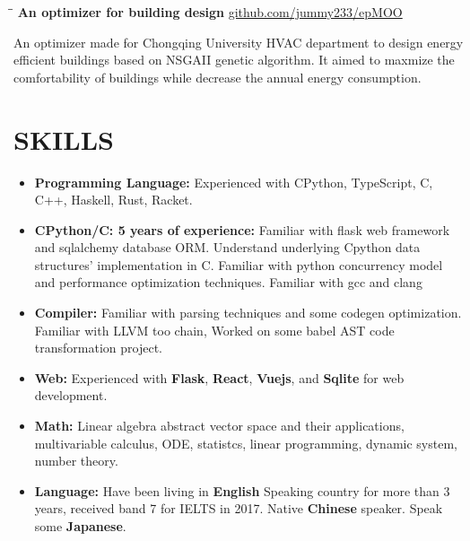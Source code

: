 \documentclass{res}
\begin{document}
\begin{resume}
    \vspace{-0.2in}
    \begin{tabbing}
        \hspace{2.4in}\= \hspace{0.9in}\= \kill
        {\bf An optimizer for building design} \>               \>\url{github.com/jummy233/epMOO}\\
    \end{tabbing}\vspace{-30pt}
    An optimizer made for Chongqing University HVAC department
    to design energy efficient buildings based on NSGAII genetic algorithm.
    It aimed to maxmize the comfortability of buildings while decrease the
    annual energy consumption.

\section{SKILLS}
    \begin{itemize}[leftmargin=-.2in]
        \setlength\itemsep{-1em}

        \item \textbf{Programming Language:} Experienced with CPython, TypeScript, C, C++, Haskell, Rust, Racket.\\
        \item \textbf{CPython/C: 5 years of experience:} Familiar with flask web framework and sqlalchemy database ORM. Understand underlying Cpython data structures' implementation in C. Familiar with python concurrency model and performance optimization techniques. Familiar with gcc and clang\\
        \item \textbf{Compiler:} Familiar with parsing techniques and some codegen optimization. Familiar with LLVM too chain, Worked on some babel AST code transformation project. \\
        \item \textbf{Web:} Experienced with \textbf{Flask}, \textbf{React}, \textbf{Vuejs}, and \textbf{Sqlite} for web development. \\
        \item \textbf{Math:} Linear algebra abstract vector space and their applications, multivariable calculus, ODE, statistcs, linear programming, dynamic system, number theory. \\
        \item \textbf{Language:}
    Have been living in \textbf{English} Speaking country for more than 3 years, received band 7 for IELTS in 2017. Native \textbf{Chinese} speaker. Speak some \textbf{Japanese}.
    \end{itemize}


\end{resume}
\end{document}
